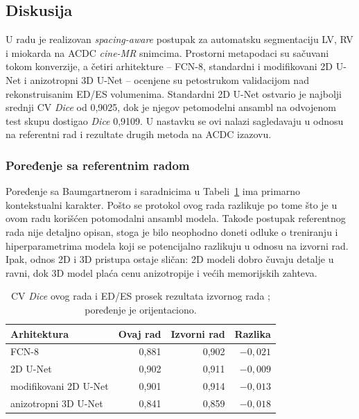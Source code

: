 \documentclass[11pt,a4paper]{article}
\begin{document}
\subsection{Diskusija}
U radu je realizovan \textit{spacing-aware} postupak za automatsku segmentaciju LV, RV i miokarda na
ACDC \textit{cine-MR} snimcima. Prostorni metapodaci su sačuvani tokom konverzije, a četiri arhitekture --
FCN-8, standardni i modifikovani 2D U-Net i anizotropni 3D U-Net -- ocenjene su petostrukom
validacijom nad rekonstruisanim ED/ES volumenima. Standardni 2D U-Net ostvario je najbolji srednji
CV \textit{Dice} od 0,9025, dok je njegov petomodelni ansambl na odvojenom test skupu dostigao
\textit{Dice} 0,9109. U nastavku se ovi nalazi sagledavaju u odnosu na referentni rad i rezultate
drugih metoda na ACDC izazovu.

\subsubsection{Poređenje sa referentnim radom}
Poređenje sa Baumgartnerom i saradnicima u Tabeli~\ref{tab:paper} ima primarno kontekstualni karakter.
Pošto se protokol ovog rada razlikuje po tome što je u ovom radu korišćen potomodalni ansambl modela.
Takođe postupak referentnog rada nije detaljno opisan, stoga je bilo neophodno doneti odluke o treniranju i hiperparametrima
modela koji se potencijalno razlikuju u odnosu na izvorni rad. Ipak, odnos 2D i 3D pristupa ostaje
sličan: 2D modeli dobro čuvaju detalje u ravni, dok 3D model plaća cenu anizotropije i većih
memorijskih zahteva.

\begin{table}[H]
	\centering
	\caption{CV \textit{Dice} ovog rada i ED/ES prosek rezultata izvornog rada \cite{baumgartner2017}; poređenje je orijentaciono.}
	\label{tab:paper}
	\begin{tabular}{lrrr}
		\toprule
		Arhitektura           & Ovaj rad & Izvorni rad & Razlika  \\
		\midrule
		FCN-8                 & 0,881    & 0,902       & $-0,021$ \\
		2D U-Net              & 0,902    & 0,911       & $-0,009$ \\
		modifikovani 2D U-Net & 0,901    & 0,914       & $-0,013$ \\
		anizotropni 3D U-Net  & 0,841    & 0,859       & $-0,018$ \\
		\bottomrule
	\end{tabular}
\end{table}
\end{document}
